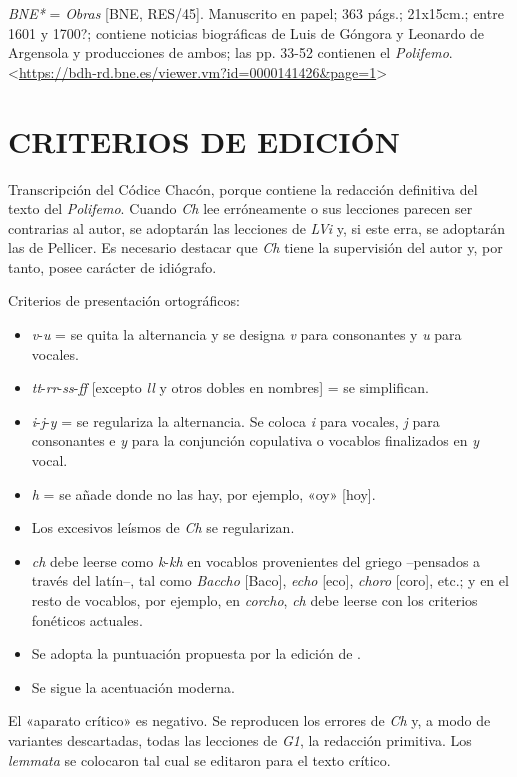 \documentclass[11pt,a4paper,twoside]{article}
\newcommand{\comillas}[1]{«#1»}
\begin{document}
\textit{BNE*} = \textit{Obras} [BNE, RES/45]. 
%
Manuscrito en papel; 363 págs.; 21x15cm.; entre 1601 y 1700?; contiene noticias biográficas de Luis de Góngora y Leonardo de Argensola y producciones de ambos; las pp. 33-52 contienen el \textit{Polifemo}. <\url{https://bdh-rd.bne.es/viewer.vm?id=0000141426&page=1}>\par

\section*{\fontsize{11}{14}\selectfont CRITERIOS DE EDICIÓN}

Transcripción del Códice Chacón, porque contiene la redacción definitiva del texto del \textit{Polifemo}. Cuando \textit{Ch} lee erróneamente o sus lecciones parecen ser contrarias al autor, se adoptarán las lecciones de \textit{LVi} y, si este erra, se adoptarán las de Pellicer. Es necesario destacar que \textit{Ch} tiene la supervisión del autor y, por tanto, posee carácter de idiógrafo.\par
%
Criterios de presentación ortográficos: 
%
\begin{itemize}[label=--]%
\item \textit{v}-\textit{u} = se quita la alternancia y se designa \textit{v} para consonantes y \textit{u} para vocales.
\item \textit{tt}-\textit{rr}-\textit{ss}-\textit{ff} [excepto \textit{ll} y otros dobles en nombres] = se simplifican.
\item \textit{i}-\textit{j}-\textit{y} = se regulariza la alternancia. Se coloca \textit{i} para vocales, \textit{j }para consonantes e \textit{y} para la conjunción copulativa o vocablos finalizados en \textit{y} vocal.
\item \textit{h} = se añade donde no las hay, por ejemplo, «oy» [hoy].
\item Los excesivos leísmos de \textit{Ch} se regularizan.
\item \textit{ch} debe leerse como \textit{k}-\textit{kh} en vocablos provenientes del griego --pensados a través del latín--, tal como \textit{Baccho} [Baco], \textit{echo} [eco], \textit{choro} [coro], etc.; y en el resto de vocablos, por ejemplo, en \textit{corcho}, \textit{ch} debe leerse con los criterios fonéticos actuales.
\item Se adopta la puntuación propuesta por la edición de \textcite{Alonso1967}.
\item Se sigue la acentuación moderna.
\end{itemize}\par
%
El \comillas{aparato crítico} es negativo. Se reproducen los errores de \textit{Ch} y, a modo de variantes descartadas, todas las lecciones de \textit{G1}, la redacción primitiva. Los \textit{lemmata} se colocaron tal cual se editaron para el texto crítico.\par
\end{document}
